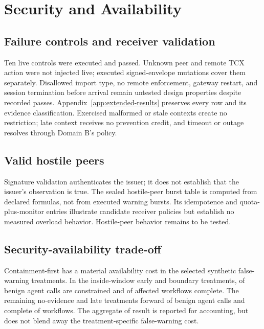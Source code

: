 \section{Security and Availability}

\subsection{Failure controls and receiver validation}

Ten live controls were executed and passed. Unknown peer and remote TCX action were not injected live; executed signed-envelope mutations cover them separately. Disallowed import type, no remote enforcement, gateway restart, and session termination before arrival remain untested design properties despite recorded passes. Appendix~\ref{app:extended-results} preserves every row and its evidence classification. Exercised malformed or stale contexts create no restriction; late context receives no prevention credit, and timeout or outage resolves through Domain B's policy.

\subsection{Valid hostile peers}

Signature validation authenticates the issuer; it does not establish that the issuer's observation is true. The sealed hostile-peer burst table is computed from declared formulas, not from executed warning bursts. Its idempotence and quota-plus-monitor entries illustrate candidate receiver policies but establish no measured overload behavior. Hostile-peer behavior remains to be tested.

\subsection{Security-availability trade-off}

Containment-first has a material availability cost in the selected synthetic false-warning treatments. In the inside-window early and boundary treatments, \InsideWindowBenignConstrained{} of \InsideWindowBenignAttempted{} benign agent calls are constrained and \InsideWindowWorkflowCompleted{} of \InsideWindowWorkflowTotal{} affected workflows complete. The remaining no-evidence and late treatments forward \OutsideWindowBenignForwarded{} of \OutsideWindowBenignAttempted{} benign agent calls and complete \OutsideWindowWorkflowCompleted{} of \OutsideWindowWorkflowTotal{} workflows. The aggregate \WorkflowCompleted{} of \WorkflowTotal{} result is reported for accounting, but does not blend away the treatment-specific false-warning cost.


